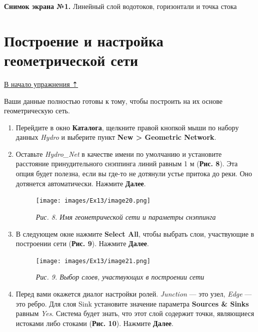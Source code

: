 \documentclass[12pt,]{book}
\begin{document}
\textbf{Снимок экрана №1.} Линейный слой водотоков, горизонтали и точка стока

\hypertarget{network-hydro-gnetwork}{%
\section{Построение и настройка геометрической сети}\label{network-hydro-gnetwork}}

\protect\hyperlink{network-hydro}{В начало упражнения ⇡}

Ваши данные полностью готовы к тому, чтобы построить на их основе геометрическую сеть.

\begin{enumerate}
\def\labelenumi{\arabic{enumi}.}
\item
  Перейдите в окно \textbf{Каталога}, щелкните правой кнопкой мыши по набору данных \emph{Hydro} и выберите пункт \textbf{New \textgreater{} Geometric Network}.
\item
  Оставьте \emph{Hydro\_Net} в качестве имени по умолчанию и установите расстояние принудительного снэппинга линий равным 1 м (\textbf{Рис. 8}). Эта опция будет полезна, если вы где-то не дотянули устье притока до реки. Оно дотянется автоматически. Нажмите \textbf{Далее}.

  \begin{figure}
  \centering
  \texttt{[image: images/Ex13/image20.png]}
  \caption{\emph{Рис. 8. Имя геометрической сети и параметры снэппинга}}
  \end{figure}
\item
  В следующем окне нажмите \textbf{Select All}, чтобы выбрать слои, участвующие в построении сети (\textbf{Рис. 9}). Нажмите \textbf{Далее}.

  \begin{figure}
  \centering
  \texttt{[image: images/Ex13/image21.png]}
  \caption{\emph{Рис. 9. Выбор слоев, участвующих в построении сети}}
  \end{figure}
\item
  Перед вами окажется диалог настройки ролей. \emph{Junction} --- это узел, \emph{Edge} --- это ребро. Для слоя Sink установите значение параметра \textbf{Sources \& Sinks} равным \emph{Yes}. Система будет знать, что этот слой содержит точки, являющиеся истоками либо стоками (\textbf{Рис. 10}). Нажмите \textbf{Далее}.


\end{enumerate}
\end{document}
